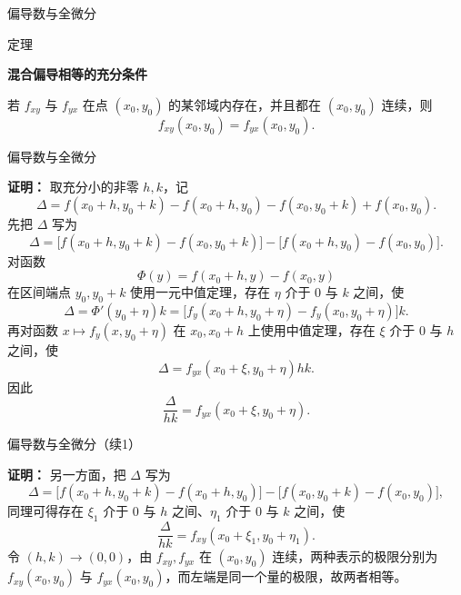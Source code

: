 \documentclass[aspectratio=169,10pt,fontset=fandol]{ctexbeamer}
\begin{document}
\begin{frame}[t,fragile]{偏导数与全微分}
\footnotesize
\begin{block}{定理}
{\footnotesize
\textbf{混合偏导相等的充分条件}\par

若 $f_{xy}$ 与 $f_{yx}$ 在点 $(x_0,y_0)$ 的某邻域内存在，并且都在 $(x_0,y_0)$ 连续，则
\[
f_{xy}(x_0,y_0)=f_{yx}(x_0,y_0).
\]

}
\end{block}
\end{frame}
\begin{frame}[t,fragile]{偏导数与全微分}
\footnotesize
{\footnotesize
\textbf{证明：}
取充分小的非零 $h,k$，记
\[
\Delta=f(x_0+h,y_0+k)-f(x_0+h,y_0)-f(x_0,y_0+k)+f(x_0,y_0).
\]
先把 $\Delta$ 写为
\[
\Delta=\bigl[f(x_0+h,y_0+k)-f(x_0,y_0+k)\bigr]
-\bigl[f(x_0+h,y_0)-f(x_0,y_0)\bigr].
\]
对函数
\[
\Phi(y)=f(x_0+h,y)-f(x_0,y)
\]
在区间端点 $y_0,y_0+k$ 使用一元中值定理，存在 $\eta$ 介于 $0$ 与 $k$ 之间，使
\[
\Delta=\Phi'(y_0+\eta)k
=\bigl[f_y(x_0+h,y_0+\eta)-f_y(x_0,y_0+\eta)\bigr]k.
\]
再对函数 $x\mapsto f_y(x,y_0+\eta)$ 在 $x_0,x_0+h$ 上使用中值定理，存在 $\xi$ 介于 $0$ 与 $h$ 之间，使
\[
\Delta=f_{yx}(x_0+\xi,y_0+\eta)hk.
\]
因此
\[
\frac{\Delta}{hk}=f_{yx}(x_0+\xi,y_0+\eta).
\]


}
\end{frame}
\begin{frame}[t,fragile]{偏导数与全微分（续1）}
\footnotesize
{\footnotesize
\textbf{证明：}
另一方面，把 $\Delta$ 写为
\[
\Delta=\bigl[f(x_0+h,y_0+k)-f(x_0+h,y_0)\bigr]
-\bigl[f(x_0,y_0+k)-f(x_0,y_0)\bigr],
\]
同理可得存在 $\xi_1$ 介于 $0$ 与 $h$ 之间、$\eta_1$ 介于 $0$ 与 $k$ 之间，使
\[
\frac{\Delta}{hk}=f_{xy}(x_0+\xi_1,y_0+\eta_1).
\]
令 $(h,k)\to(0,0)$，由 $f_{xy},f_{yx}$ 在 $(x_0,y_0)$ 连续，两种表示的极限分别为 $f_{xy}(x_0,y_0)$ 与 $f_{yx}(x_0,y_0)$，而左端是同一个量的极限，故两者相等。

}
\end{frame}
\end{document}

